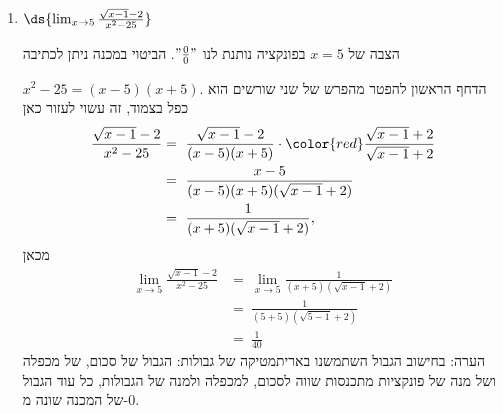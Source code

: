 \begin{enumerate}
\item
$\ds{
\lim_{x\to 5} \frac{ \sqrt{x-1} - 2}{x^2-25}
} $
\ifsol
{}
\begin{solbox}
הצבה של
$x=5$
בפונקציה נותנת לנו
$"\frac{0}{0}"$.
הביטוי במכנה ניתן לכתיבה

$x^2-25=(x-5)(x+5)$.
הדחף הראשון להפטר מהפרש של שני שורשים הוא כפל בצמוד, זה עשוי לעזור כאן
\begin{align*}
\frac{\sqrt{x-1}-2}{x^2-25}&=\ \frac{\sqrt{x-1}-2}{(x-5)(x+5)}\cdot{\color{red}\frac{\sqrt{x-1}+2}{\sqrt{x-1}+2}}\\
&=\ \frac{x-5}{(x-5)(x+5)(\sqrt{x-1}+2)}\\
&=\ \frac{1}{(x+5)(\sqrt{x-1}+2)},
\end{align*}
מכאן
\begin{align*}
    \lim_{x\to 5} \frac{ \sqrt{x-1} - 2}{x^2-25}&=\ \lim_{x\to 5} \frac{1}{(x+5)(\sqrt{x-1}+2)}\\
    &=\ \frac{1}{(5+5)(\sqrt{5-1}+2)}\\
    &=\ \frac{1}{40}
\end{align*}
הערה: בחישוב הגבול השתמשנו באריתמטיקה של גבולות: הגבול של סכום, של מכפלה ושל מנה של פונקציות מתכנסות שווה לסכום, למכפלה ולמנה של הגבולות, כל עוד הגבול של המכנה שונה מ-$0$.
\end{solbox}
\fi


\end{enumerate}

